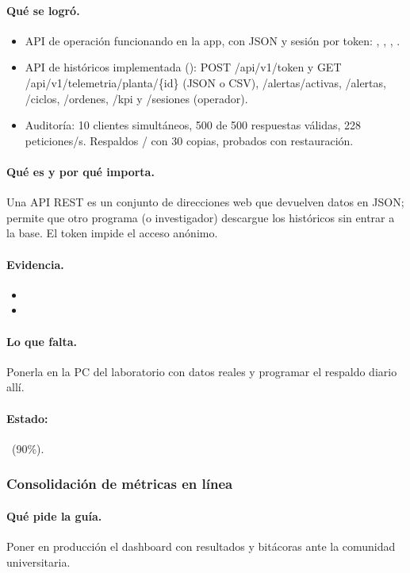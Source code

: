 \documentclass[a4paper,11pt]{article}
\begin{document}
\paragraph{Qué se logró.}
\begin{itemize}
\item API de operación funcionando en la app, con JSON y sesión por token: , , , .
\item API de históricos implementada (): POST /api/v1/token y GET /api/v1/telemetria/planta/\{id\} (JSON o CSV), /alertas/activas, /alertas, /ciclos, /ordenes, /kpi y /sesiones (operador).
\item Auditoría: 10 clientes simultáneos, 500 de 500 respuestas válidas, 228 peticiones/s. Respaldos / con 30 copias, probados con restauración.
\end{itemize}
\paragraph{Qué es y por qué importa.} Una API REST es un conjunto de direcciones web que devuelven datos en JSON; permite que otro programa (o investigador) descargue los históricos sin entrar a la base. El token impide el acceso anónimo.
\paragraph{Evidencia.}
\begin{itemize}\small
\item {}
\item {}
\end{itemize}
\paragraph{Lo que falta.} Ponerla en la PC del laboratorio con datos reales y programar el respaldo diario allí.
\paragraph{Estado:} \parcial~(90\%).
\subsubsection{Consolidación de métricas en línea}
\paragraph{Qué pide la guía.} Poner en producción el dashboard con resultados y bitácoras ante la comunidad universitaria.
\end{document}

